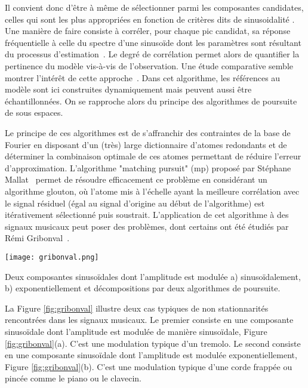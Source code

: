Il convient donc d'être à même de sélectionner parmi les composantes candidates, celles qui sont les plus appropriées en fonction de critères dits de \og sinusoidalité \fg. Une manière de faire consiste à corréler, pour chaque pic candidat, sa réponse fréquentielle à celle du spectre d'une sinusoïde dont les paramètres sont résultant du processus d'estimation~\cite{peak-selection}. Le degré de corrélation permet alors de quantifier la pertinence du modèle vis-à-vis de l'observation. Une étude comparative semble montrer l'intérêt de cette approche~\cite{wells2010comparative}. Dans cet algorithme, les références au modèle sont ici construites dynamiquement mais peuvent aussi être échantillonnées. On se rapproche alors du principe des algorithmes de poursuite de sous espaces.

Le principe de ces algorithmes est de s'affranchir des contraintes de la base de Fourier en disposant d'un (très) large dictionnaire d'atomes redondants et de déterminer la combinaison optimale de ces atomes permettant de réduire l'erreur d'approximation. L'algorithme "matching pursuit" (mp) proposé par Stéphane Mallat~\cite{mallat1993matching} permet de résoudre efficacement ce problème en considérant un algorithme glouton, où l'atome mis à l'échelle ayant la meilleure corrélation avec le signal résiduel (égal au signal d'origine au début de l'algorithme) est itérativement sélectionné puis soustrait. L'application de cet algorithme à des signaux musicaux peut poser des problèmes, dont certains ont été étudiés par Rémi Gribonval~\cite{gribonval1996sound}. %

\begin{marginfigure}
  \texttt{[image: gribonval.png]}
  \caption{Deux composantes sinusoïdales dont l'amplitude est modulée a) sinusoïdalement, b) exponentiellement et décompositions par deux algorithmes de poursuite.}
  \label{fig:gribonval}
\end{marginfigure}

La Figure \ref{fig:gribonval} illustre deux cas typiques de non stationnarités rencontrées dans les signaux musicaux. Le premier consiste en une composante sinusoïdale dont l'amplitude est modulée de manière sinusoïdale, Figure \ref{fig:gribonval}(a). C'est une modulation typique d'un tremolo. Le second consiste en une composante sinusoïdale dont l'amplitude est modulée exponentiellement, Figure \ref{fig:gribonval}(b). C'est une modulation typique d'une corde frappée ou pincée comme le piano ou le clavecin.

